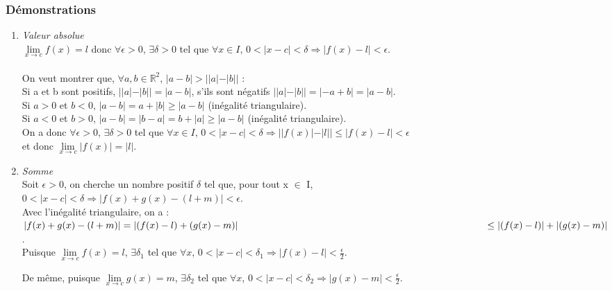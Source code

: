 \documentclass[a4paper,10pt]{book} %
\newcommand{\R}{\mathbb{R}}
\begin{document}
\subsubsection{Démonstrations}
\begin{enumerate}
\item \emph{Valeur absolue}\\

$\lim\limits_{x\rightarrow c}f(x)=l$ donc $\forall \epsilon>0$, $\exists \delta>0$ tel que $\forall x\in I$, $0<|{x-c}|<\delta \Rightarrow |f(x)-l|<\epsilon$.\\\\

On veut montrer que, $\forall a,b \in \R^{2}$, $|a-b|>||a|-|b||$ :\\

Si a et b sont positifs, $||a|-|b||=|a-b|$, s'ils sont négatifs $||a|-|b||=|-a+b|=|a-b|$.\\
Si $a>0$ et $b<0$, $|a-b|=a+|b|\geq |a-b|$ (inégalité triangulaire).\\
Si $a<0$ et $b>0$, $|a-b|=|b-a|=b+|a|\geq |a-b|$ (inégalité triangulaire).\\

On a donc $\forall \epsilon>0$, $\exists \delta>0$ tel que $\forall x\in I$, $0<|x-c|<\delta \Rightarrow ||f(x)|-|l||\leq|f(x)-l|<\epsilon$\\
et donc $\lim\limits_{x\rightarrow c}|f(x)|=|l|$.\\

\item \emph{Somme}\\

Soit $\epsilon>0$, on cherche un nombre positif $\delta$ tel que, pour tout x $\in$ I,\\$0<|x-c|<\delta\Rightarrow |f(x)+g(x)-(l+m)|<\epsilon$.\\

Avec l'inégalité triangulaire, on a : $|f(x)+g(x)-(l+m)|=|(f(x)-l)+(g(x)-m)|\\
\hspace*{8.95cm}\leq |(f(x)-l)|+|(g(x)-m)|$.\\

Puisque $\lim\limits_{x\rightarrow c} f(x)=l$, $\exists\delta_{1}$ tel que $\forall x$, $0<|x-c|<\delta_{1} \Rightarrow|f(x)-l|<\frac{\epsilon}{2}$.

De même, puisque $\lim\limits_{x\rightarrow c} g(x)=m$, $\exists\delta_{2}$ tel que $\forall x$, $0<|x-c|<\delta_{2} \Rightarrow|g(x)-m|<\frac{\epsilon}{2}$.\\


\end{enumerate}
\end{document}
